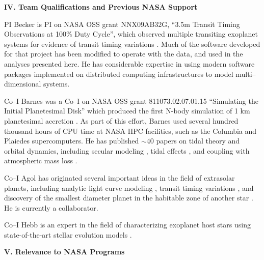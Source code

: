\bigskip
\centerline{\bf IV. Team Qualifications and Previous NASA Support}
\smallskip

PI Becker is PI on NASA OSS grant NNX09AB32G, ``3.5m Transit Timing
Observations at 100\% Duty Cycle'', which observed multiple transiting
exoplanet systems for evidence of transit timing variations
\citep{2011ApJ...731..123K, 2013ApJ...764....8K, 2013ApJ...764L..17B,
  2013arXiv1304.5713K}.  Much of the software developed for that
project has been modified to operate with the \kepler data, and used in
the analyses presented here.  He has considerable expertise in using
modern software packages implemented on distributed computing
infrastructures to model multi--dimensional systems.  


Co--I Barnes was a Co--I on NASA OSS grant 811073.02.07.01.15
``Simulating the Initial Planetesimal Disk'' which produced the first
N-body simulation of 1 km planetesimal accretion
\citep{Barnes09_1km}. As part of this effort, Barnes used several hundred thousand hours of CPU time at NASA HPC facilities, such as the Columbia and Plaiedes supercomputers. He has published $\sim 40$ papers on tidal theory and orbital dynamics, including secular modeling \citep{BarnesGreenberg06a}, tidal effects \citep{Barnes13}, and coupling with atmospheric mass loss \citep{Jackson10,Barnes13}. 

Co--I Agol has originated several important ideas in the field of
extrasolar planets, including analytic light curve
modeling \citep{2002ApJ...580L.171M}, transit timing
variations \citep{2005MNRAS.359..567A}, and discovery of the smallest
diameter planet in the habitable zone of another
star \citep{2013arXiv1304.7387B}.  He is currently a \kepler
collaborator.

Co--I Hebb is an expert in the field of characterizing exoplanet host
stars using state-of-the-art stellar evolution
models \citep[e.g.][]{Hebb2009,Hebb2010,Bouchy2010,Yilen2013}.

\bigskip
\centerline{\bf V. Relevance to NASA Programs}
\smallskip


